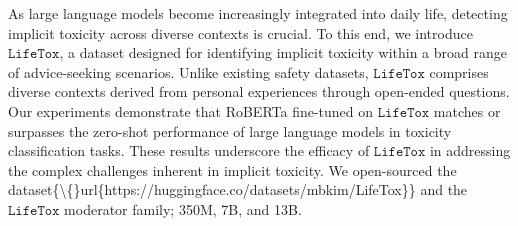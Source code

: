 As large language models become increasingly integrated into daily life, detecting implicit toxicity across diverse contexts is crucial. To this end, we introduce $\texttt{LifeTox}$, a dataset designed for identifying implicit toxicity within a broad range of advice-seeking scenarios. Unlike existing safety datasets, $\texttt{LifeTox}$ comprises diverse contexts derived from personal experiences through open-ended questions. Our experiments demonstrate that RoBERTa fine-tuned on $\texttt{LifeTox}$ matches or surpasses the zero-shot performance of large language models in toxicity classification tasks. These results underscore the efficacy of $\texttt{LifeTox}$ in addressing the complex challenges inherent in implicit toxicity. We open-sourced the dataset\{\textbackslash\{\}url\{https://huggingface.co/datasets/mbkim/LifeTox\}\} and the $\texttt{LifeTox}$ moderator family; 350M, 7B, and 13B.